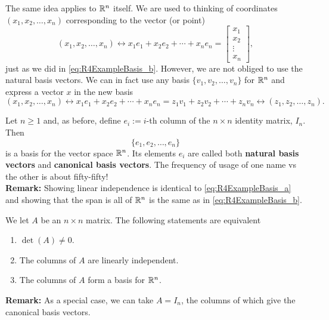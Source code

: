 The same idea applies to $\real^n$ itself. We are used to thinking of coordinates $\left(x_1, x_2, \ldots, x_n  \right)$ corresponding to the vector (or point) 
$$\left(x_1, x_2, \ldots, x_n  \right) \longleftrightarrow x_1 e_1 + x_2 e_2 + \cdots + x_n e_n = \left[\begin{array}{r}
    x_1 \\ x_2 \\ \vdots \\ x_n
\end{array}\right] ,$$ 
just as we did in \eqref{eq:R4ExampleBasis_b}. However, we are not obliged to use the natural basis vectors. We can in fact use any basis $\{ v_1, v_2, \ldots, v_n\}$ for $\real^n$ and express a vector $x$ in the new basis
$$\left(x_1, x_2, \ldots, x_n  \right) \longleftrightarrow x_1 e_1 + x_2 e_2 + \cdots + x_n e_n = z_1 v_1 + z_2 v_2 + \cdots + z_n v_n  \longleftrightarrow \left(z_1, z_2, \ldots, z_n  \right).$$ 


\vspace*{0.5cm}
\begin{tcolorbox}[sharp corners, colback=green!30, colframe=green!80!blue, title=\textbf{\Large Canonical or Natural Basis Vectors }] Let $n\ge1$ and, as before, define $e_i:= i$-th column of the $n \times n$ identity matrix, $I_n$. Then $$\{ e_1, e_2, \ldots, e_n\}$$ is a basis for the vector space $\real^n$. Its elements $e_i$ are called both \textbf{natural basis vectors} and \textbf{canonical basis vectors}. The frequency of usage of one name vs the other is about fifty-fifty!\\

\textbf{Remark:}  Showing linear independence is identical to \eqref{eq:R4ExampleBasis_a} and showing that the span is all of $\real^n$ is the same as in \eqref{eq:R4ExampleBasis_b}. 
\end{tcolorbox}
\vspace*{0.5cm}

\begin{tcolorbox}[title=\textbf{\Large Columns of Matrices and Bases of $\real^n$}]
We let $A$ be an $n\times n$ matrix. The following statements are equivalent
\begin{enumerate}
\renewcommand{\labelenumi}{(\alph{enumi})}
\setlength{\itemsep}{.2cm}
    \item $\det(A)\neq 0$.
    \item The columns of $A$ are linearly independent.
     \item The columns of $A$ form a basis for $\real^n$.
\end{enumerate}

\textbf{Remark:} As a special case, we can take $A = I_n$, the columns of which give the canonical basis vectors.
   
\end{tcolorbox}

